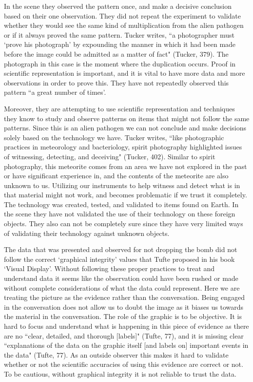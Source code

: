 \documentclass[11pt, oneside]{article}
\begin{document}
\par In the scene they observed the pattern once, and make a decisive conclusion based on their one observation. They did not repeat the experiment to validate whether they would see the same kind of multiplication from the alien pathogen or if it always proved the same pattern. Tucker writes, ``a photographer must `prove his photograph' by expounding the manner in which it had been made before the image could be admitted as a matter of fact" (Tucker, 379). The photograph in this case is the moment where the duplication occurs. Proof in scientific representation is important, and it is vital to have more data and more observations in order to prove this. They have not repeatedly observed this pattern ``a great number of times'.

\par Moreover, they are attempting to use scientific representation and techniques they know to study and observe patterns on items that might not follow the same patterns. Since this is an alien pathogen we can not conclude and make decisions solely based on the technology we have. Tucker writes, ``like photographic practices in meteorology and bacteriology, spirit photography highlighted issues of witnessing, detecting, and deceiving" (Tucker, 402). Similar to spirit photography, this meteorite comes from an area we have not explored in the past or have significant experience in, and the contents of the meteorite are also unknown to us. Utilizing our instruments to help witness and detect what is in that material might not work, and becomes problematic if we trust it completely. The technology was created, tested, and validated to items found on Earth. In the scene they have not validated the use of their technology on these foreign objects. They also can not be completely sure since they have very limited ways of validating their technology against unknown objects.

\par The data that was presented and observed for not dropping the bomb did not follow the correct `graphical integrity' values that Tufte proposed in his book `Visual Display'. Without following these proper practices to treat and understand data it seems like the observation could have been rushed or made without complete considerations of what the data could represent. Here we are treating the picture as the evidence rather than the conversation. Being engaged in the conversation does not allow us to doubt the image as it biases us towards the material in the conversation. The role of the graphic is to be objective. It is hard to focus and understand what is happening in this piece of evidence as there are no ``clear, detailed, and thorough [labels]" (Tufte, 77), and it is missing clear ``explanations of the data on the graphic itself [and labels on] important events in the data" (Tufte, 77). As an outside observer this makes it hard to validate whether or not the scientific accuracies of using this evidence are correct or not. To be cautious, without graphical integrity it is not reliable to trust the data.
\end{document}
